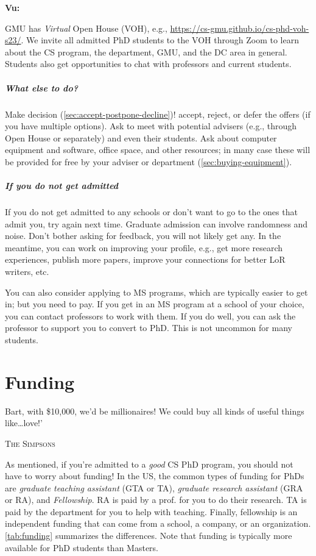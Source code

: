 \documentclass[oneside,11pt,dvipsnames]{book}
\newenvironment{commentbox}[1][]{
  \small
  \begin{mybox}
    {\small \textbf{#1}}
  }{
  \end{mybox}
}
\begin{document}
\begin{commentbox}[Vu:]
  GMU has \emph{Virtual} Open House (VOH), e.g., \url{https://cs-gmu.github.io/cs-phd-voh-s23/}. We invite all admitted PhD students to the VOH through Zoom to learn about the CS program, the department, GMU, and the DC area in general. Students also get opportunities to chat with professors and current students.
\end{commentbox}

\paragraph{What else to do?} Make decision (\autoref{sec:accept-postpone-decline})! accept, reject, or defer the offers (if you have multiple options). Ask to meet with potential advisers (e.g., through Open House or separately) and even their students. Ask about computer equipment and software, office space, and other resources; in many case these will be provided for free by your adviser or department (\autoref{sec:buying-equipment}).

\paragraph{If you do not get admitted} If you do not get admitted to any schools or don't want to go to the ones that admit you, try again next time.  Graduate admission can involve randomness and noise.  Don't bother asking for feedback, you will not likely get any.  In the meantime, you can work on improving your profile, e.g., get more research experiences, publish more papers, improve your connections for better LoR writers, etc.

You can also consider applying to MS programs, which are typically easier to get in; but you need to pay.  If you get in an MS program at a school of your choice, you can contact professors to work with them. If you do well, you can ask the professor to support you to convert to PhD.  This is not uncommon for many students.



\chapter{Funding}\label{sec:funding}

\epigraph{Bart, with \$10,000, we’d be millionaires! We could buy all kinds of useful things like…love!’}{\textsc{The Simpsons}}

As mentioned, if you're admitted to a \emph{good} CS PhD program, you should not have to worry about funding!
In the US, the common types of funding for PhDs are \emph{graduate teaching assistant} (GTA or TA), \emph{graduate research assistant} (GRA or RA), and \emph{Fellowship}.
RA is paid by a prof. for you to do their research. TA is paid by the department for you to help with teaching. Finally, fellowship is an independent funding that can come from a school, a company, or an organization. \autoref{tab:funding} summarizes the differences.
Note that funding is typically more available for PhD students than
Masters.
\end{document}
